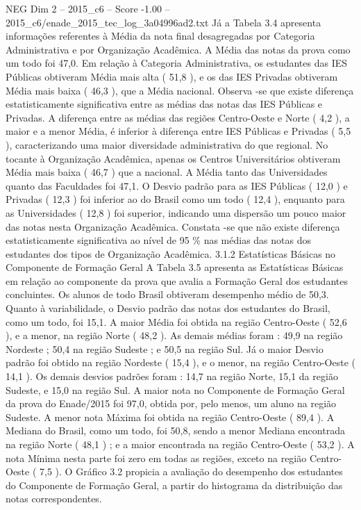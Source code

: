 \begin{textsample}{NEG Dim 2 – 2015\_c6 – Score -1.00 – 2015\_c6/enade\_2015\_tec\_log\_3a04996ad2.txt}
Já a Tabela 3.4 apresenta informações referentes à Média da nota final desagregadas por Categoria Administrativa e por Organização Acadêmica.
A Média das notas da prova como um todo foi 47,0.
Em relação à Categoria Administrativa, os estudantes das IES Públicas obtiveram Média mais alta ( 51,8 ), e os das IES Privadas obtiveram Média mais baixa ( 46,3 ), que a Média nacional.
Observa -se que existe diferença estatisticamente significativa entre as médias das notas das IES Públicas e Privadas.
A diferença entre as médias das regiões Centro-Oeste e Norte ( 4,2 ), a maior e a menor Média, é inferior à diferença entre IES Públicas e Privadas ( 5,5 ), caracterizando uma maior diversidade administrativa do que regional.
No tocante à Organização Acadêmica, apenas os Centros Universitários obtiveram Média mais baixa ( 46,7 ) que a nacional.
A Média tanto das Universidades quanto das Faculdades foi 47,1.
O Desvio padrão para as IES Públicas ( 12,0 ) e Privadas ( 12,3 ) foi inferior ao do Brasil como um todo ( 12,4 ), enquanto para as Universidades ( 12,8 ) foi superior, indicando uma dispersão um pouco maior das notas nesta Organização Acadêmica.
Constata -se que não existe diferença estatisticamente significativa ao nível de 95 \% nas médias das notas dos estudantes dos tipos de Organização Acadêmica. 3.1.2 Estatísticas Básicas no Componente de Formação Geral A Tabela 3.5 apresenta as Estatísticas Básicas em relação ao componente da prova que avalia a Formação Geral dos estudantes concluintes.
Os alunos de todo Brasil obtiveram desempenho médio de 50,3.
Quanto à variabilidade, o Desvio padrão das notas dos estudantes do Brasil, como um todo, foi 15,1.
A maior Média foi obtida na região Centro-Oeste ( 52,6 ), e a menor, na região Norte ( 48,2 ).
As demais médias foram : 49,9 na região Nordeste ; 50,4 na região Sudeste ; e 50,5 na região Sul.
Já o maior Desvio padrão foi obtido na região Nordeste ( 15,4 ), e o menor, na região Centro-Oeste ( 14,1 ).
Os demais desvios padrões foram : 14,7 na região Norte, 15,1 da região Sudeste, e 15,0 na região Sul.
A maior nota no Componente de Formação Geral da prova do Enade/2015 foi 97,0, obtida por, pelo menos, um aluno na região Sudeste.
A menor nota Máxima foi obtida na região Centro-Oeste ( 89,4 ).
A Mediana do Brasil, como um todo, foi 50,8, sendo a menor Mediana encontrada na região Norte ( 48,1 ) ; e a maior encontrada na região Centro-Oeste ( 53,2 ).
A nota Mínima nesta parte foi zero em todas as regiões, exceto na região Centro-Oeste ( 7,5 ).
O Gráfico 3.2 propicia a avaliação do desempenho dos estudantes do Componente de Formação Geral, a partir do histograma da distribuição das notas correspondentes.

\end{textsample}
